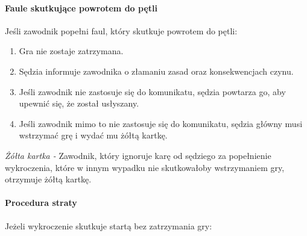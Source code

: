 \documentclass[12pt]{article}
\begin{document}
\paragraph{Faule skutkujące powrotem do pętli}
Jeśli zawodnik
popełni faul, który skutkuje powrotem do pętli:

\begin{enumerate}
	\item
	      Gra nie zostaje zatrzymana.
	\item
	      Sędzia informuje zawodnika o złamaniu zasad oraz konsekwencjach czynu.
	\item
	      Jeśli zawodnik nie zastosuje się do komunikatu, sędzia powtarza go,
	      aby upewnić się, że został usłyszany.
	\item
	      Jeśli zawodnik mimo to nie zastosuje się do komunikatu, sędzia główny
	      musi wstrzymać grę i wydać mu żółtą kartkę.
\end{enumerate}

\emph{Żółta kartka -} Zawodnik, który ignoruje karę od sędziego za
popełnienie wykroczenia, które w innym wypadku nie skutkowałoby
wstrzymaniem gry, otrzymuje żółtą kartkę.

\paragraph{Procedura straty}
Jeżeli wykroczenie skutkuje startą
bez zatrzymania gry:
\end{document}
